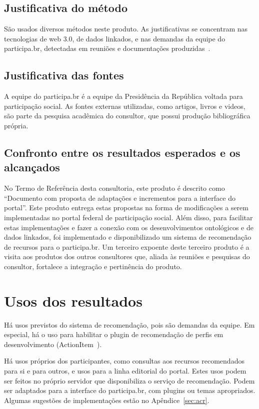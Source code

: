 \documentclass[12pt]{article}
\begin{document}
\subsection{Justificativa do método}
São usados diversos métodos neste produto. As justificativas se concentram nas tecnologias de web 3.0, de dados linkados, e nas demandas da equipe do participa.br, detectadas em reuniões e documentações produzidas~\cite{pnudExtra}.
\subsection{Justificativa das fontes}
A equipe do participa.br é a equipe da Presidência da República voltada para participação social. As fontes externas utilizadas, como artigos, livros e videos, são parte da pesquisa acadêmica do consultor, que possui produção bibliográfica própria.
\subsection{Confronto entre os resultados esperados e os alcançados}
No Termo de Referência desta consultoria, este produto é descrito como ``Documento com proposta de adaptações e incrementos para a interface do portal''. Este produto entrega estas propostas na forma de modificações a serem implementadas no portal federal de participação social. Além disso, para facilitar estas implementações e fazer a conexão com os desenvolvimentos ontológicos e de dados linkados, foi implementado e disponibilizado um sistema de recomendação de recursos para o participa.br. Um terceiro expoente deste terceiro produto é a visita aos produtos dos outros consultores que, aliada às reuniões e pesquisas do consultor, fortalece a integração e pertinência do produto.
\section{Usos dos resultados}\label{sec:uso}
Há usos previstos do sistema de recomendação, pois são demandas da equipe. Em especial, há o uso para habilitar o plugin de recomendação de perfis em desenvolvimento (ActionItem~\cite{actionItem}).

Há usos próprios dos participantes, como consultas aos recursos recomendados para si e para outros, e usos para a linha editorial do portal. Estes usos podem ser feitos no próprio servidor que disponibiliza o serviço de recomendação. Podem ser adaptados para a interface do participa.br, com plugins ou temas apropriados. Algumas sugestões de implementações estão no Apêndice~\ref{sec:acr}.
\end{document}
